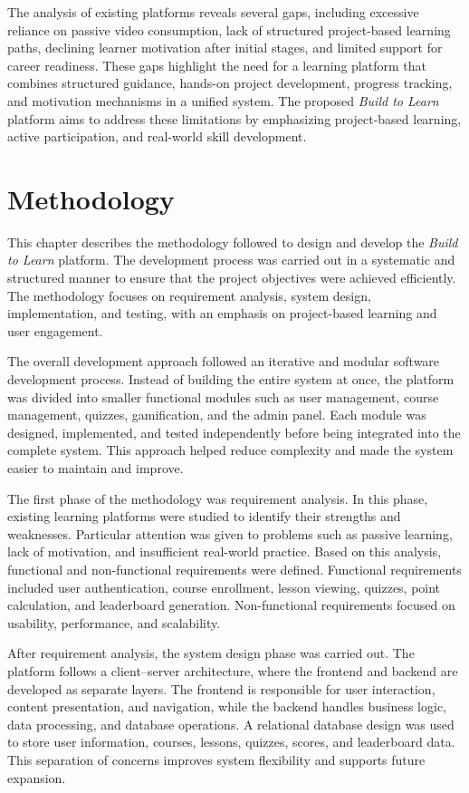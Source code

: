 \documentclass[final,3p,times,twocolumn]{elsarticle}
\begin{document}
The analysis of existing platforms reveals several gaps, including excessive reliance on passive video consumption, lack of structured project-based learning paths, declining learner motivation after initial stages, and limited support for career readiness. These gaps highlight the need for a learning platform that combines structured guidance, hands-on project development, progress tracking, and motivation mechanisms in a unified system. The proposed \textit{Build to Learn} platform aims to address these limitations by emphasizing project-based learning, active participation, and real-world skill development.


\section{Methodology}
This chapter describes the methodology followed to design and develop the \textit{Build to Learn} platform. The development process was carried out in a systematic and structured manner to ensure that the project objectives were achieved efficiently. The methodology focuses on requirement analysis, system design, implementation, and testing, with an emphasis on project-based learning and user engagement.

The overall development approach followed an iterative and modular software development process. Instead of building the entire system at once, the platform was divided into smaller functional modules such as user management, course management, quizzes, gamification, and the admin panel. Each module was designed, implemented, and tested independently before being integrated into the complete system. This approach helped reduce complexity and made the system easier to maintain and improve.

The first phase of the methodology was requirement analysis. In this phase, existing learning platforms were studied to identify their strengths and weaknesses. Particular attention was given to problems such as passive learning, lack of motivation, and insufficient real-world practice. Based on this analysis, functional and non-functional requirements were defined. Functional requirements included user authentication, course enrollment, lesson viewing, quizzes, point calculation, and leaderboard generation. Non-functional requirements focused on usability, performance, and scalability.

After requirement analysis, the system design phase was carried out. The platform follows a client–server architecture, where the frontend and backend are developed as separate layers. The frontend is responsible for user interaction, content presentation, and navigation, while the backend handles business logic, data processing, and database operations. A relational database design was used to store user information, courses, lessons, quizzes, scores, and leaderboard data. This separation of concerns improves system flexibility and supports future expansion.
\end{document}
